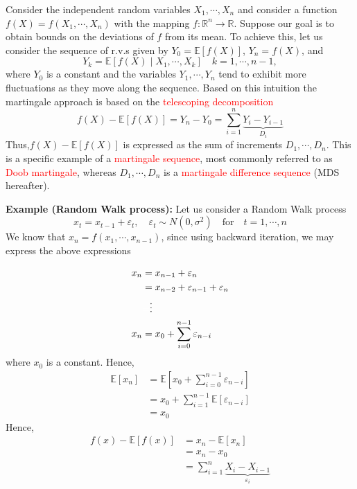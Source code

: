 \documentclass[10pt,handout,english]{beamer}
\newcommand{\E}{\mathbb{E}}
\newcommand{\R}{\mathbb{R}}
\newcommand{\1}{\mathbbm{1}}
\begin{document}
\begin{frame}[allowframebreaks]
 Consider the independent random variables $X_1,\cdots,X_n$ and consider a function $f(X)=f(X_1,\cdots,X_n)$ with the mapping $f:\R^n\to\R$. Suppose our goal is to obtain bounds on the deviations of $f$ from its mean. To achieve this, let us consider the sequence of r.v.s given by $Y_0=\E[f(X)]$, $Y_n=f(X)$, and
\[
Y_k=\E[f(X)\mid X_1,\cdots,X_k]\quad k=1,\cdots,n-1,
\]
where $Y_0$ is a constant and the variables $Y_1,\cdots,Y_n$ tend to exhibit more fluctuations as they move along the sequence. Based on this intuition the martingale approach is based on the \textcolor{red}{telescoping decomposition} 
\[
f(X)-\E[f(X)]=Y_n-Y_0=\sum\limits_{i=1}^n\underbrace{Y_i-Y_{i-1}}_{D_i}
\]
Thus,$f(X)-\E[f(X)]$ is expressed as the sum of increments $D_1,\cdots,D_n$. This is a specific example of a \textcolor{red}{martingale sequence}, most commonly referred to as \textcolor{red}{Doob martingale}, whereas $D_{1},\cdots,D_n$ is a \textcolor{red}{martingale difference sequence} (MDS hereafter).
\end{frame}
\begin{frame}[allowframebreaks]
\textbf{Example (Random Walk process):} Let us consider a Random Walk process
\[
x_t=x_{t-1}+\varepsilon_t,\quad\varepsilon_t\sim N(0,\sigma^2)\quad \text{for}\quad t=1,\cdots,n
\]
We know that $x_n=f(x_1,\cdots,x_{n-1})$, since using backward iteration, we may express the above expressions

\begingroup
\allowdisplaybreaks
\begin{align*}
x_n&=x_{n-1}+\varepsilon_n\\
&= x_{n-2}+\varepsilon_{n-1}+\varepsilon_n\\
&\textcolor{white}{=}\vdots\\
x_n&=x_0+\sum\limits_{i=0}^{n-1}\varepsilon_{n-i}
\end{align*} 
\endgroup
where $x_0$ is a constant. Hence,
\begin{align*}
\E[x_n]&=\E\left[x_0+\sum\limits_{i=0}^{n-1}\varepsilon_{n-i}\right]\\
&=x_0+\sum\limits_{i=1}^{n-1}\E[\varepsilon_{n-i}]\\
&=x_0
\end{align*}
Hence, 
\begingroup
\begin{align*}
f(x)-\E[f(x)]&=x_n-\E[x_n]\\
&=x_n-x_0\\
&=\sum\limits_{i=1}^{n}\underbrace{X_i-X_{i-1}}_{\varepsilon_i}
\end{align*}
\endgroup
\end{frame}
\end{document}

